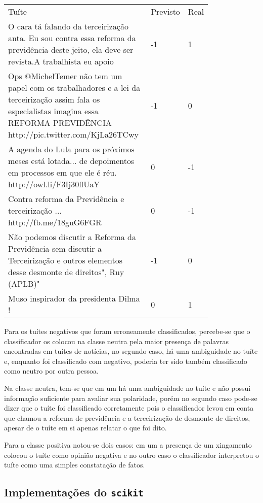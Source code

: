 \begin{table}[H]
	\centering	
	\begin{tabular}{| p{0.8\linewidth} | l | l |}
		\hline
		Tuíte & Previsto & Real \\
		O cara tá falando da terceirização anta. Eu sou contra essa reforma da previdência deste jeito, ela deve ser revista.A trabalhista eu apoio & -1 &  1 \\
		\hline
		Ops @MichelTemer não tem um papel com os trabalhadores e a lei da terceirização assim fala os especialistas imagina essa REFORMA PREVIDÊNCIA  http://pic.twitter.com/KjLa26TCwy &  -1 & 0 \\
		\hline
		A agenda do Lula para os próximos meses está lotada... de depoimentos em processos em que ele é réu. http://owl.li/F3Ij30flUaY & 0 & -1 \\
		\hline
		Contra reforma da Previdência e terceirização ... http://fb.me/18guG6FGR & 0 & -1 \\
		\hline
		Não podemos discutir a Reforma da Previdência sem discutir a Terceirização e outros elementos desse desmonte de direitos", Ruy (APLB)" & -1 & 0 \\
		\hline
		Muso inspirador da presidenta Dilma ! & 0 & 1 \\
		\hline
	\end{tabular}
\end{table} 

Para os tuítes negativos que foram erroneamente classificados, percebe-se que o classificador os
colocou na classe neutra pela maior presença de palavras encontradas em tuítes de notícias, no segundo
caso, há uma ambiguidade no tuíte e, enquanto foi classificado com negativo, poderia
ter sido também classificado como neutro por outra pessoa.

Na classe neutra, tem-se que em um há uma ambiguidade no tuíte e não possui informação suficiente
para avaliar sua polaridade, porém no segundo caso pode-se dizer que o tuíte foi classificado corretamente
pois o classificador levou em conta que chamou a reforma de previdência e a terceirização de desmonte
de direitos, apesar de o tuíte em si apenas relatar o que foi dito.

Para a classe positiva notou-se dois casos: em um a presença de um xingamento colocou o tuíte como
opinião negativa e no outro caso o classificador interpretou o tuíte como uma simples constatação
de fatos.


\subsection{Implementações do \texttt{scikit}}

